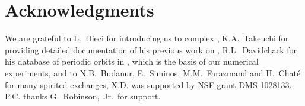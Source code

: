 \documentclass[final,leqno,onefignum,onetabnum]{siamltexmm}
\begin{document}
\section*{Acknowledgments}

We are grateful to L.~Dieci for introducing us to complex
\psd, K.A.~Takeuchi for providing detailed documentation of his previous work
on \cLvs, R.L.~Davidchack for his database of periodic
orbits in \KSe, which is the basis of our numerical experiments,
and to
N.B.~Budanur,  E.~Siminos,  M.M.~Farazmand and H.~Chat\'e
for many spirited exchanges,
X.D. was supported by NSF grant DMS-1028133.
P.C. thanks
G.~Robinson,~Jr.\ for support.



\end{document}
